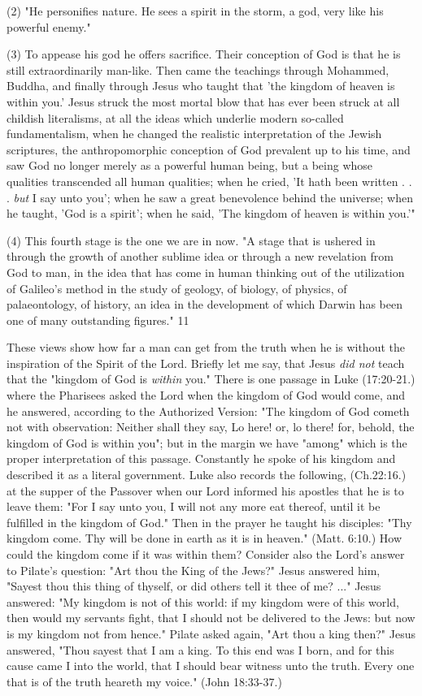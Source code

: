 (2) "He personifies nature. He sees a spirit in the storm, a god, very like his powerful
enemy."

(3) To appease his god he offers sacrifice. Their conception of God is that he is still
extraordinarily man-like. Then came the teachings through Mohammed, Buddha, and finally
through Jesus who taught that 'the kingdom of heaven is within you.' Jesus struck the most
mortal blow that has ever been struck at all childish literalisms, at all the ideas which
underlie modern so-called fundamentalism, when he changed the realistic interpretation of
the Jewish scriptures, the anthropomorphic conception of God prevalent up to his time, and
saw God no longer merely as a powerful human being, but a being whose qualities
transcended all human qualities; when he cried, 'It hath been written . . . \textit{but} I say unto you';
when he saw a great benevolence behind the universe; when he taught, 'God is a spirit'; when
he said, 'The kingdom of heaven is within you.'"

(4) This fourth stage is the one we are in now. "A stage that is ushered in through the growth
of another sublime idea or through a new revelation from God to man, in the idea that has
come in human thinking out of the utilization of Galileo's method in the study of geology, of
biology, of physics, of palaeontology, of history, an idea in the development of which
Darwin has been one of many outstanding figures." 11

These views show how far a man can get from the truth when he is without the inspiration of
the Spirit of the Lord. Briefly let me say, that Jesus \textit{did not} teach that the "kingdom of God is
\textit{within} you." There is one passage in Luke (17:20-21.) where the Pharisees asked the Lord
when the kingdom of God would come, and he answered, according to the Authorized
Version: "The kingdom of God cometh not with observation: Neither shall they say, Lo here!
or, lo there! for, behold, the kingdom of God is within you"; but in the margin we have
"among" which is the proper interpretation of this passage. Constantly he spoke of his
kingdom and described it as a literal government. Luke also records the following, (Ch.22:16.) at the supper of the Passover when our Lord informed his apostles that he is to leave
them: "For I say unto you, I will not any more eat thereof, until it be fulfilled in the kingdom
of God." Then in the prayer he taught his disciples: "Thy kingdom come. Thy will be done in
earth as it is in heaven." (Matt. 6:10.) How could the kingdom come if it was within them?
Consider also the Lord's answer to Pilate's question: "Art thou the King of the Jews?" Jesus
answered him, "Sayest thou this thing of thyself, or did others tell it thee of me? ..." Jesus
answered: "My kingdom is not of this world: if my kingdom were of this world, then would
my servants fight, that I should not be delivered to the Jews: but now is my kingdom not
from hence." Pilate asked again, "Art thou a king then?" Jesus answered, "Thou sayest that I
am a king. To this end was I born, and for this cause came I into the world, that I should bear
witness unto the truth. Every one that is of the truth heareth my voice." (John 18:33-37.)

